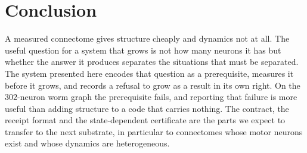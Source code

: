 \documentclass[11pt]{article}
\theoremstyle{remark}
\begin{document}
\section{Conclusion}

A measured connectome gives structure cheaply and dynamics not at all. The useful question for a
system that grows is not how many neurons it has but whether the answer it produces separates the
situations that must be separated. The system presented here encodes that question as a
prerequisite, measures it before it grows, and records a refusal to grow as a result in its own
right. On the $302$-neuron worm graph the prerequisite fails, and reporting that failure is more
useful than adding structure to a code that carries nothing. The contract, the receipt format and
the state-dependent certificate are the parts we expect to transfer to the next substrate, in
particular to connectomes whose motor neurons exist and whose dynamics are heterogeneous.
\end{document}
